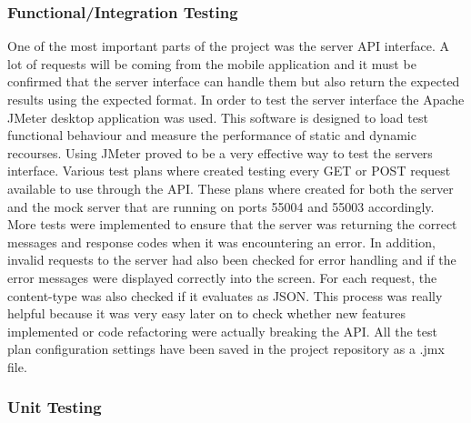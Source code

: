 \subsubsection{Functional/Integration Testing}
One of the most important parts of the project was the server API interface. A lot of requests will 
be coming from the mobile application and it must be confirmed that the server interface can handle 
them but also return the expected results using the expected format. In order to test the server 
interface the Apache JMeter desktop application was used. This software is designed to load test 
functional behaviour and measure the performance of static and dynamic recourses. Using JMeter 
proved to be a very effective way to test the servers interface. Various test plans where created 
testing every GET or POST request available to use through the API. These plans where created for 
both the server and the mock server that are running on ports 55004 and 55003 accordingly. More 
tests were implemented to ensure that the server was returning the correct messages and response 
codes when it was encountering an error. In addition, invalid requests to the server had also been 
checked for error handling and if the error messages were displayed correctly into the screen. For 
each request, the content-type was also checked if it evaluates as JSON. This process was really 
helpful because it was very easy later on to check whether new features implemented or code 
refactoring were actually breaking the API. All the test plan configuration settings have been saved 
in the project repository as a .jmx file. 

\subsubsection{Unit Testing} 

